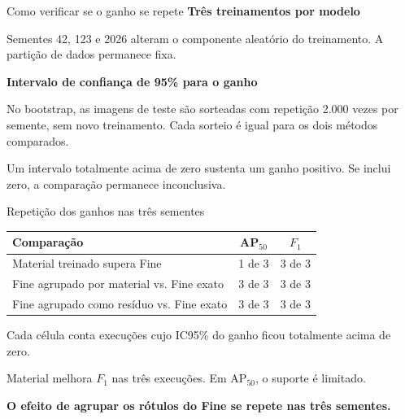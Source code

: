 \documentclass[aspectratio=169,10pt]{beamer}
\begin{document}
\begin{frame}{Como verificar se o ganho se repete}
  \vspace{0.12cm}
  {\color{ufpidark}\fontsize{14.8}{18.0}\selectfont\bfseries Três treinamentos por modelo}\par
  \vspace{0.07cm}
  {\fontsize{11.5}{14.8}\selectfont Sementes 42, 123 e 2026 alteram o componente aleatório do treinamento. A partição de dados permanece fixa.}\par
  \vspace{0.24cm}
  {\color{ufpidark}\fontsize{14.8}{18.0}\selectfont\bfseries Intervalo de confiança de 95\% para o ganho}\par
  \vspace{0.07cm}
  {\fontsize{11.5}{14.8}\selectfont No bootstrap, as imagens de teste são sorteadas com repetição 2.000 vezes por semente, sem novo treinamento. Cada sorteio é igual para os dois métodos comparados.}\par
  \vspace{0.21cm}
  {\fontsize{11.5}{14.8}\selectfont Um intervalo totalmente acima de zero sustenta um ganho positivo. Se inclui zero, a comparação permanece inconclusiva.}
\end{frame}

\begin{frame}{Repetição dos ganhos nas três sementes}
  \vspace{0.07cm}
  \renewcommand{\arraystretch}{1.55}
  {\fontsize{9.8}{13.1}\selectfont
  \begin{tabular}{p{7.5cm}c@{\hspace{0.65cm}}c}
    \toprule
    \textbf{Comparação} & \textbf{AP$_{50}$} & \textbf{$F_1$} \\
    \midrule
    Material treinado supera Fine & 1 de 3 & 3 de 3 \\
    Fine agrupado por material vs. Fine exato & 3 de 3 & 3 de 3 \\
    Fine agrupado como resíduo vs. Fine exato & 3 de 3 & 3 de 3 \\
    \bottomrule
  \end{tabular}}\par
  \vspace{0.15cm}
  {\color{muted}\fontsize{9.0}{11.5}\selectfont Cada célula conta execuções cujo IC95\% do ganho ficou totalmente acima de zero.}\par
  \vspace{0.24cm}
  {\fontsize{11.5}{14.8}\selectfont Material melhora $F_1$ nas três execuções. Em AP$_{50}$, o suporte é limitado.}\par
  \vspace{0.11cm}
  {\color{ufpidark}\fontsize{11.5}{14.8}\selectfont\bfseries O efeito de agrupar os rótulos do Fine se repete nas três sementes.}
\end{frame}
\end{document}

